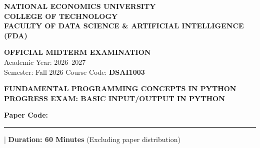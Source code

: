 \documentclass[11pt,a4paper]{article}
\begin{document}

\noindent
\begin{minipage}[t]{0.64\textwidth}
  \raggedright\small
  \textbf{NATIONAL ECONOMICS UNIVERSITY}\\
  \textbf{COLLEGE OF TECHNOLOGY}\\
  \textbf{FACULTY OF DATA SCIENCE \& ARTIFICIAL INTELLIGENCE (FDA)}
\end{minipage}%
\hfill
\begin{minipage}[t]{0.34\textwidth}
  \raggedleft\footnotesize
  \textbf{OFFICIAL MIDTERM EXAMINATION}\\
  Academic Year: 2026--2027\\
  Semester: Fall 2026 \quad Course Code: \textbf{DSAI1003}
\end{minipage}

\vspace{0.2em}

\begin{center}
  {\Large\bfseries\color{ForestGreen} FUNDAMENTAL PROGRAMMING CONCEPTS IN PYTHON}\\[0.10em]
  {\normalsize\bfseries PROGRESS EXAM: BASIC INPUT/OUTPUT IN PYTHON}\\[0.10em]
  {\normalsize\textbf{Paper Code:} \rule{1.6cm}{0.4pt} \quad | \quad \textbf{Duration: 60 Minutes} (Excluding paper distribution)}
\end{center}

\vspace{0.1em}
\end{document}
